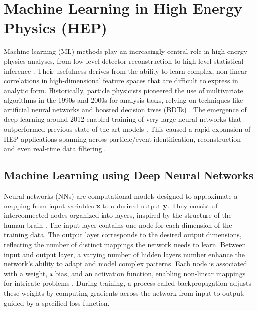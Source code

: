 \chapter{Machine Learning in High Energy Physics (HEP)}

Machine-learning (ML) methods play an increasingly central role in high-energy-physics analyses, from low-level detector reconstruction to high-level statistical inference \cite{PhysRevD.112.016004}. Their usefulness derives from the ability to learn complex, non-linear correlations in high-dimensional feature spaces that are difficult to express in analytic form. Historically, particle physicists pioneered the use of multivariate algorithms in the 1990s and 2000s for analysis tasks, relying on techniques like artificial neural networks and boosted decision trees (BDTs) \cite{Guest_2018}. The emergence of deep learning around 2012 enabled training of very large neural networks that outperformed previous state of the art models \cite{Guest_2018}. This caused a rapid expansion of HEP applications spanning across particle/event identification, reconstruction and even real-time data filtering \cite{albertsson2019machinelearninghighenergy}.


\section{Machine Learning using Deep Neural Networks}

Neural networks (NNs) are computational models designed to approximate a mapping from input variables \textbf{x} to a desired output \textbf{y}. They consist of interconnected nodes organized into layers, inspired by the structure of the human brain \cite{hammad2024artificialneuralnetworkdeep}. The input layer contains one node for each dimension of the training data. The output layer corresponds to the desired output dimensions, reflecting the number of distinct mappings the network needs to learn. Between input and output layer, a varying number of hidden layers number enhance the network’s ability to adapt and model complex patterns. Each node is associated with a weight, a bias, and an activation function, enabling non-linear mappings for intricate problems \cite{Goodfellow-et-al-2016}. During training, a process called backpropagation adjusts these weights by computing gradients across the network from input to output, guided by a specified loss function.

